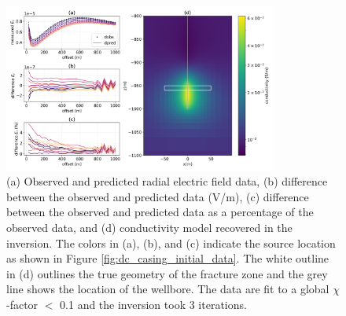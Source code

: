 \begin{figure}
    \begin{center}
    \includegraphics[width=0.8\textwidth]{figures/inversion/dc_smooth_inversion_1e-01.png}
    \end{center}
\caption{
    (a) Observed and predicted radial electric field data,
    (b) difference between the observed and predicted data (V/m),
    (c) difference between the observed and predicted data as a percentage of the observed data,
    and (d) conductivity model recovered in the inversion.
    The colors in (a), (b), and (c) indicate the source location as shown in Figure \ref{fig:dc_casing_initial_data}.
    The white outline in (d) outlines the true geometry of the fracture zone and the grey line shows the location of the wellbore.
    The data are fit to a global $\chi$-factor $<$ 0.1 and the inversion took 3 iterations.
}
\label{fig:dc_smooth_inversion_1e-01}
\end{figure}
